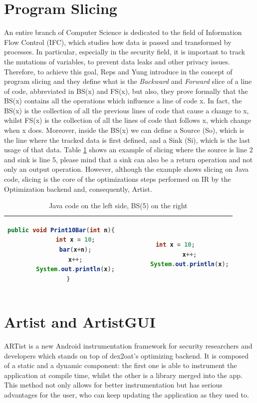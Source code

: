 \section{Program Slicing}
An entire branch of Computer Science is dedicated to the field of Information Flow Control (IFC), which studies how data is passed and transformed by processes. In particular, especially in the security field, it is important to track the mutations of variables, to prevent data leaks and other privacy issues. Therefore, to achieve this goal, Reps and Yung introduce in \cite{slicing} the concept of program slicing and they define what is the \emph{Backward} and \emph{Forward} slice of a line of code, abbreviated in BS(x) and FS(x), but also, they prove formally that the BS(x) contains all the operations which influence a line of code x. In fact, the BS(x) is the collection of all the previous lines of code that cause a change to x, whilst FS(x) is the collection of all the lines of code that follows x, which change when x does. Moreover, inside the BS(x) we can define a Source (So), which is the line where the tracked data is first defined, and a Sink (Si), which is the last usage of that data. Table \ref{tab:slicing} shows an example of slicing where the source is line 2 and sink is line 5, please mind that a sink can also be a return operation and not only an output operation. However, although the example shows slicing on Java code, slicing is the core of the optimizations steps performed on  IR by the Optimization backend and, consequently, Artist.    

\lstset{numbers=none}
\begin{table}[h!]
  \centering
  \begin{tabular}{|c|c|}
  	\hline
	\begin{lstlisting}[language=Java]
	public void Print10Bar(int n){
		int x = 10;
		bar(x+n);
		x++;
		System.out.println(x);
	}
	\end{lstlisting} &
	\begin{lstlisting}[language=Java]
		int x = 10;
		x++;
		System.out.println(x);
	\end{lstlisting} \\
	\hline
  \end{tabular}
    \caption{Java code on the left side, BS(5) on the right}
	\label{tab:slicing}
\end{table}


\section{Artist and ArtistGUI}
ARTist is a new Android instrumentation framework for security researchers and developers which stands on top of dex2oat's optimizing backend. It is composed of a static and a dynamic component: the first one is able to instrument the application at compile time, whilst the other is a library merged into the app. This method not only allows for better instrumentation but has serious advantages for the user, who can keep updating the application as they used to.

